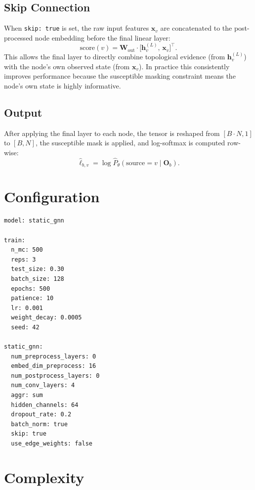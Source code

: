 \documentclass[12pt,a4paper]{report}
\newcommand{\bh}{\mathbf{h}}
\newcommand{\bx}{\mathbf{x}}
\newcommand{\bW}{\mathbf{W}}
\begin{document}
\subsection{Skip Connection}

When \texttt{skip: true} is set, the raw input features $\bx_v$ are
concatenated to the post-processed node embedding before the final linear layer:
\begin{equation}
  \text{score}(v) = \bW_{\text{out}} \cdot \bigl[\bh_v^{(L)},\, \bx_v\bigr]^\top.
\end{equation}
This allows the final layer to directly combine topological evidence (from $\bh_v^{(L)}$)
with the node's own observed state (from $\bx_v$). In practice this consistently
improves performance because the susceptible masking constraint means the node's
own state is highly informative.

\subsection{Output}

After applying the final layer to each node, the tensor is reshaped from
$[B \cdot N, 1]$ to $[B, N]$, the susceptible mask is applied, and
log-softmax is computed row-wise:
\begin{equation}
  \hat{\ell}_{b,v} = \log \hat{P}_\theta(\text{source} = v \mid \mathbf{O}_b).
\end{equation}

\section{Configuration}

\begin{lstlisting}[language=bash,caption={StaticGNN config for \texttt{france\_office} (from \texttt{exp/france\_office/static\_gnn.yml}).}]
model: static_gnn

train:
  n_mc: 500
  reps: 3
  test_size: 0.30
  batch_size: 128
  epochs: 500
  patience: 10
  lr: 0.001
  weight_decay: 0.0005
  seed: 42

static_gnn:
  num_preprocess_layers: 0
  embed_dim_preprocess: 16
  num_postprocess_layers: 0
  num_conv_layers: 4
  aggr: sum
  hidden_channels: 64
  dropout_rate: 0.2
  batch_norm: true
  skip: true
  use_edge_weights: false
\end{lstlisting}

\section{Complexity}
\end{document}

